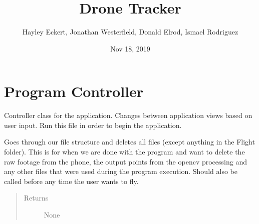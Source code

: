 \documentclass[letterpaper,10pt,english]{sphinxmanual}
\title{Drone Tracker}
\date{Nov 18, 2019}
\author{Hayley Eckert, Jonathan Westerfield, Donald Elrod, Ismael Rodriguez}
\begin{document}
\pagestyle{empty}
\sphinxmaketitle
\pagestyle{plain}
\sphinxtableofcontents
\pagestyle{normal}
\label{\detokenize{index::doc}}



\chapter{Program Controller}
\label{\detokenize{index:module-src.Controllers.Program_Controller}}\label{\detokenize{index:program-controller}}

\begin{fulllineitems}
\label{\detokenize{index:src.Controllers.Program_Controller.Controller}}
Controller class for the application. Changes between application views based on user input.
Run this file in order to begin the application.

\begin{fulllineitems}
\label{\detokenize{index:src.Controllers.Program_Controller.Controller.cleanup}}
Goes through our file structure and deletes all files (except anything in the Flight folder).
This is for when we are done with the program and want to delete the raw footage from the phone,
the output points from the opencv processing and any other files that were used during the
program execution. Should also be called before any time the user wants to fly.
\begin{quote}\begin{description}
\item[{Returns}] \leavevmode
None

\end{description}\end{quote}

\end{fulllineitems}


\end{fulllineitems}
\end{document}

